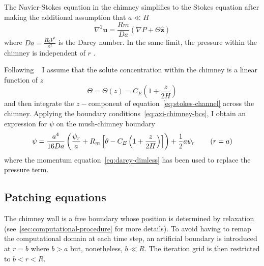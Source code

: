 \documentclass[11pt]{proc}
\begin{document}
The Navier-Stokes equation in the chimney simplifies to the Stokes equation after making the additional assumption that $a \ll H$
\begin{equation}
\label{eq:stokes-channel}
\nabla^2 \mathbf{u} = \frac{Rm}{Da} \left(\nabla P + \Theta \mathbf{\hat{z}} \right)
\end{equation}
where $Da=\frac{\Pi_0 V^2}{\kappa^2}$ is the Darcy number. In the same limit, the pressure within the chimney is independent of $r$ \citep*{schulze-worster-98}.

Following ~\citet*{rees-jones-worster-13} I assume that the solute concentration within the chimney is a linear function of $z$
\begin{equation}
\Theta = \Theta(z) = C_E \left( 1 + \frac{z}{2H} \right)
\end{equation}
and then integrate the $z-$component of equation~\eqref{eq:stokes-channel} across the chimney. Applying the boundary conditions~\eqref{eq:axi-chimney-bcs}, I obtain an expression for $\psi$ on the mush-chimney boundary
\begin{equation}
\psi = \frac{a^4}{16 Da} \left(\frac{\psi_r}{a} + R_m \left[ \theta -  C_E \left( 1 + \frac{z}{2H} \right) \right] \right)   + \frac{1}{2} a \psi_r   \hspace{5ex} (r=a)
\end{equation}
where the momentum equation~\ref{eq:darcy-dimless} has been used to replace the pressure term.

\subsection{Patching equations}
\label{sec:patching-equations}
The chimney wall is a free boundary whose position is determined by relaxation (see~\autoref{sec:computational-procedure} for more details). To avoid having to remap the computational domain at each time step, an artificial boundary is introduced at $r=b$ where $b > a$ but, nonetheless, $b \ll R$. The iteration grid is then restricted to $b < r < R$. 
\end{document}
